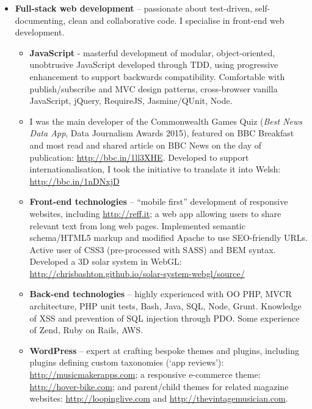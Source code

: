 \documentclass[class=article, crop=false]{standalone}
\begin{document}
\begin{itemize}
    \setlength\itemsep{0.3em}

    \item \textbf{Full-stack web development} – passionate about test-driven, self-documenting, clean and collaborative code. I specialise in front-end web development.

    \begin{itemize}
        \setlength\itemsep{0.3em}

        \item \textbf{JavaScript} - masterful development of modular, object-oriented, unobtrusive JavaScript developed through TDD, using progressive enhancement to support backwards compatibility. Comfortable with publish/subscribe and MVC design patterns, cross-browser vanilla JavaScript, jQuery, RequireJS, Jasmine/QUnit, Node.

        \item I was the main developer of the Commonwealth Games Quiz (\emph{Best News Data App}, Data Journalism Awards 2015), featured on BBC Breakfast and most read and shared article on BBC News on the day of publication: \url{http://bbc.in/1ll3XHE}. Developed to support internationalisation, I took the initiative to translate it into Welsh: \url{http://bbc.in/1nDNxjD}

        \item \textbf{Front-end technologies} – ``mobile first'' development of responsive websites, including \url{http://reff.it}; a web app allowing users to share relevant text from long web pages. Implemented semantic schema/HTML5 markup and modified Apache to use SEO-friendly URLs. Active user of CSS3 (pre-processed with SASS) and BEM syntax. Developed a 3D solar system in WebGL: \url{http://chrisbashton.github.io/solar-system-webgl/source/}

        \item \textbf{Back-end technologies} – highly experienced with OO PHP, MVCR architecture, PHP unit tests, Bash, Java, SQL, Node, Grunt. Knowledge of XSS and prevention of SQL injection through PDO. Some experience of Zend, Ruby on Rails, AWS.

        \item \textbf{WordPress} – expert at crafting bespoke themes and plugins, including plugins defining custom taxonomies (`app reviews'): \url{http://musicmakerapps.com}; a responsive e-commerce theme: \url{http://hover-bike.com}; and parent/child themes for related magazine websites: \url{http://loopinglive.com} and
        \url{http://thevintagemusician.com}.


\end{itemize}
\end{itemize}
\end{document}
